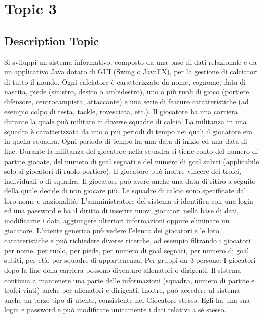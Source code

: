 \section{Topic 3}

\subsection{Description Topic}
Si sviluppi un sistema informativo, composto da una base di dati relazionale e da un applicativo Java dotato
di GUI (Swing o JavaFX), per la gestione di calciatori di tutto il mondo.
Ogni calciatore è caratterizzato da nome, cognome, data di nascita, piede (sinistro, destro o ambidestro), uno
o più ruoli di gioco (portiere, difensore, centrocampista, attaccante) e una serie di feature caratteristiche (ad
esempio colpo di testa, tackle, rovesciata, etc.).
Il giocatore ha una carriera durante la quale può militare in diverse squadre di calcio. La militanza in una
squadra è caratterizzata da uno o più periodi di tempo nei quali il giocatore era in quella squadra. Ogni
periodo di tempo ha una data di inizio ed una data di fine. Durante la militanza del giocatore nella squadra si
tiene conto del numero di partite giocate, del numero di goal segnati e del numero di goal subiti (applicabile
solo ai giocatori di ruolo portiere). Il giocatore può inoltre vincere dei trofei, individuali o di squadra.
Il giocatore può avere anche una data di ritiro a seguito della quale decide di non giocare più. Le squadre di
calcio sono specificate dal loro nome e nazionalità.
L’amministratore del sistema si identifica con una login ed una password e ha il diritto di inserire nuovi
giocatori nella base di dati, modificarne i dati, aggiungere ulteriori informazioni oppure eliminare un
giocatore.
L’utente generico può vedere l’elenco dei giocatori e le loro caratteristiche e può richiedere diverse ricerche,
ad esempio filtrando i giocatori per nome, per ruolo, per piede, per numero di goal segnati, per numero di
goal subiti, per età, per squadre di appartenenza.
Per gruppi da 3 persone: I giocatori dopo la fine della carriera possono diventare allenatori o dirigenti. Il
sistema continua a mantenere una parte delle informazioni (squadra, numero di partite e trofei vinti) anche
per allenatori e dirigenti.
Inoltre, può accedere al sistema anche un terzo tipo di utente, consistente nel Giocatore stesso. Egli ha una
sua login e password e può modificare unicamente i dati relativi a sé stesso.
